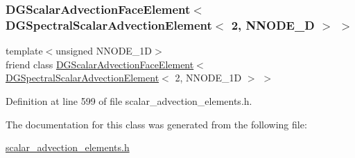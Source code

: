 \subsubsection{\texorpdfstring{D\+G\+Scalar\+Advection\+Face\+Element$<$ D\+G\+Spectral\+Scalar\+Advection\+Element$<$ 2, N\+N\+O\+D\+E\+\_\+D $>$ $>$}{DGScalarAdvectionFaceElement< DGSpectralScalarAdvectionElement< 2, NNODE\_1D > >}}
{\footnotesize\ttfamily template$<$unsigned N\+N\+O\+D\+E\+\_\+1D$>$ \\
friend class \hyperlink{classoomph_1_1DGScalarAdvectionFaceElement}{D\+G\+Scalar\+Advection\+Face\+Element}$<$ \hyperlink{classoomph_1_1DGSpectralScalarAdvectionElement}{D\+G\+Spectral\+Scalar\+Advection\+Element}$<$ 2, N\+N\+O\+D\+E\+\_\+1D $>$ $>$\hspace{0.3cm}{\ttfamily [friend]}}



Definition at line 599 of file scalar\+\_\+advection\+\_\+elements.\+h.



The documentation for this class was generated from the following file\+:\begin{DoxyCompactItemize}
\item 
\hyperlink{scalar__advection__elements_8h}{scalar\+\_\+advection\+\_\+elements.\+h}\end{DoxyCompactItemize}
